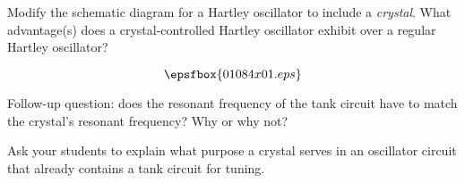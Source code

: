 

Modify the schematic diagram for a Hartley oscillator to include a {\it crystal}.  What advantage(s) does a crystal-controlled Hartley oscillator exhibit over a regular Hartley oscillator?







$$\epsfbox{01084x01.eps}$$

Follow-up question: does the resonant frequency of the tank circuit have to match the crystal's resonant frequency?  Why or why not?







Ask your students to explain what purpose a crystal serves in an oscillator circuit that already contains a tank circuit for tuning.




